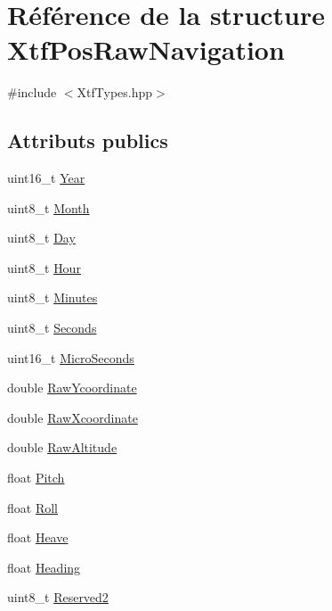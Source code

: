 \hypertarget{structXtfPosRawNavigation}{}\section{Référence de la structure Xtf\+Pos\+Raw\+Navigation}
\label{structXtfPosRawNavigation}


{\ttfamily \#include $<$Xtf\+Types.\+hpp$>$}

\subsection*{Attributs publics}
\begin{DoxyCompactItemize}
\item 
uint16\+\_\+t \hyperlink{structXtfPosRawNavigation_a2e0d32b5ebb8153b10b8865aadcbfc6a}{Year}
\item 
uint8\+\_\+t \hyperlink{structXtfPosRawNavigation_aa92e448530742a582e18d7c0af232df5}{Month}
\item 
uint8\+\_\+t \hyperlink{structXtfPosRawNavigation_aacc1cb8b7ff1a394a4921f2a0074f551}{Day}
\item 
uint8\+\_\+t \hyperlink{structXtfPosRawNavigation_a4e1507a38ce886aaad5a7f7025257a0d}{Hour}
\item 
uint8\+\_\+t \hyperlink{structXtfPosRawNavigation_a6c1b24898daf661f2485b30f84aa3329}{Minutes}
\item 
uint8\+\_\+t \hyperlink{structXtfPosRawNavigation_a937a58d418bc71b387192b164a2f494e}{Seconds}
\item 
uint16\+\_\+t \hyperlink{structXtfPosRawNavigation_a1c8375adbb055a89897c520de70386a3}{Micro\+Seconds}
\item 
double \hyperlink{structXtfPosRawNavigation_a27bba05bee4b9c2e926d76e69d90c479}{Raw\+Ycoordinate}
\item 
double \hyperlink{structXtfPosRawNavigation_a9ef5a7b17a396d5843f20e1c85035ec2}{Raw\+Xcoordinate}
\item 
double \hyperlink{structXtfPosRawNavigation_a0ad1cb103827d5e9473b10b67112fe4f}{Raw\+Altitude}
\item 
float \hyperlink{structXtfPosRawNavigation_a02d49574ae879f39c041d69551b5cc9b}{Pitch}
\item 
float \hyperlink{structXtfPosRawNavigation_ae1eb8013f24fb9b940a03ae939322d41}{Roll}
\item 
float \hyperlink{structXtfPosRawNavigation_a67afcea99ed07a3669c8f8654f394c69}{Heave}
\item 
float \hyperlink{structXtfPosRawNavigation_acf44ce9e0c1d5db57cbf6ba2dec44f4d}{Heading}
\item 
uint8\+\_\+t \hyperlink{structXtfPosRawNavigation_a2295c52a487d25358abecc90613f8b25}{Reserved2}
\end{DoxyCompactItemize}


